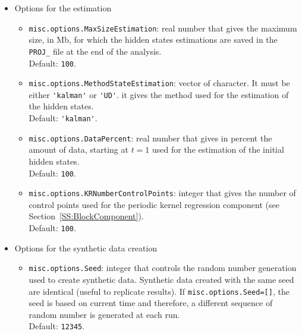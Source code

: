\begin{itemize}
\item Options for the estimation

\begin{itemize}
\item \lstinline[basicstyle = \mlttfamily \small ]!misc.options.MaxSizeEstimation!: real number that gives the maximum size, in Mb, for which the hidden states estimations are saved in the \lstinline[basicstyle = \mlttfamily \small ]!PROJ_! file at the end of the analysis. \\Default: \lstinline[basicstyle = \mlttfamily \small ]!100!.
\item \lstinline[basicstyle = \mlttfamily \small ]!misc.options.MethodStateEstimation!: vector of character. It must be either \lstinline[basicstyle = \mlttfamily \small ]!'kalman'! or \lstinline[basicstyle = \mlttfamily \small ]!'UD'!. it gives the method used for the estimation of the hidden states. \\Default: \lstinline[basicstyle = \mlttfamily \small ]!'kalman'!.
\item \lstinline[basicstyle = \mlttfamily \small ]!misc.options.DataPercent!: real number that gives in percent the amount of data, starting at $t=1$ used for the estimation of the initial hidden states. \\Default: \lstinline[basicstyle = \mlttfamily \small ]!100!.
\item \lstinline[basicstyle = \mlttfamily \small ]!misc.options.KRNumberControlPoints!: integer that gives the number of control points used for the periodic kernel regression component (see Section~\ref{SS:BlockComponent}). \\Default: \lstinline[basicstyle = \mlttfamily \small ]!100!.
\end{itemize}


\item Options for the synthetic data creation

\begin{itemize}
\item \lstinline[basicstyle = \mlttfamily \small ]!misc.options.Seed!: integer that controls the random number generation used to create synthetic data. Synthetic data created with the same seed are identical (useful to replicate results). If  \lstinline[basicstyle = \mlttfamily \small ]!misc.options.Seed=[]!, the seed is based on current time and therefore, a different sequence of random number  is generated at each run. \\Default: \lstinline[basicstyle = \mlttfamily \small ]!12345!.
\end{itemize}


\end{itemize}
